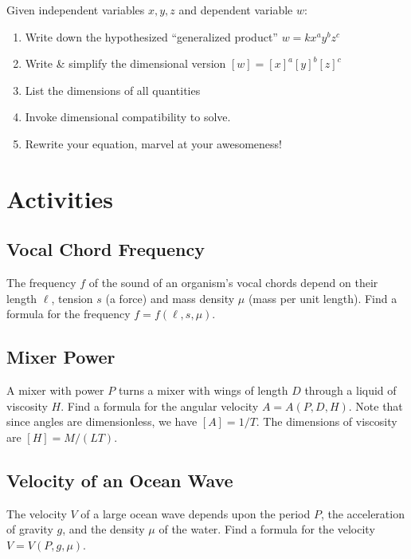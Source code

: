 \documentclass[
]{book}
\providecommand{\tightlist}{%
  \setlength{\itemsep}{0pt}\setlength{\parskip}{0pt}}
\begin{document}
Given independent variables \(x,y,z\) and dependent variable \(w\):

\begin{enumerate}
\def\labelenumi{\arabic{enumi}.}
\tightlist
\item
  Write down the hypothesized ``generalized product'' \(w = k x^a y^b z^c\)
\item
  Write \& simplify the dimensional version \([w] = [x]^a [y]^b [z]^c\)
\item
  List the dimensions of all quantities
\item
  Invoke dimensional compatibility to solve.
\item
  Rewrite your equation, marvel at your awesomeness!
\end{enumerate}

\hypertarget{activities-8}{%
\section{Activities}\label{activities-8}}

\hypertarget{vocal-chord-frequency}{%
\subsection{Vocal Chord Frequency}\label{vocal-chord-frequency}}

The frequency \(f\) of the sound of an organism's vocal chords depend on their length \(\ell\), tension \(s\) (a force) and mass density \(\mu\) (mass per unit length). Find a formula for the frequency \(f = f(\ell, s, \mu).\)

\hypertarget{mixer-power}{%
\subsection{Mixer Power}\label{mixer-power}}

A mixer with power \(P\) turns a mixer with wings of length \(D\) through a liquid of viscosity \(H\). Find a formula for the angular velocity \(A = A(P,D,H)\). Note that since angles are dimensionless, we have \([A] = 1/T\). The dimensions of viscosity are \([H] = M/(LT)\).

\hypertarget{velocity-of-an-ocean-wave}{%
\subsection{Velocity of an Ocean Wave}\label{velocity-of-an-ocean-wave}}

The velocity \(V\) of a large ocean wave depends upon the period \(P\), the acceleration of gravity \(g\), and the density \(\mu\) of the water. Find a formula for the velocity \(V=V(P,g,\mu)\).
\end{document}
